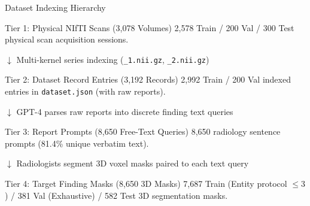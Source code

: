 \documentclass[aspectratio=169, 10pt]{beamer}
\begin{document}
\begin{frame}{Dataset Indexing Hierarchy}
    \vspace{-0.5em}
    \begin{block}{Tier 1: Physical NIfTI Scans (3,078 Volumes)}
        \footnotesize 2,578 Train / 200 Val / 300 Test physical scan acquisition sessions.
    \end{block}
    
    \vspace{-0.3em}
    \centering \tiny \color{tealaccent} $\downarrow$ Multi-kernel series indexing (\texttt{\_1.nii.gz}, \texttt{\_2.nii.gz}) \color{black}
    \vspace{-0.3em}
    
    \begin{block}{Tier 2: Dataset Record Entries (3,192 Records)}
        \footnotesize 2,992 Train / 200 Val indexed entries in \texttt{dataset.json} (with raw reports).
    \end{block}
    
    \vspace{-0.3em}
    \centering \tiny \color{tealaccent} $\downarrow$ GPT-4 parses raw reports into discrete finding text queries \color{black}
    \vspace{-0.3em}
    
    \begin{block}{Tier 3: Report Prompts (8,650 Free-Text Queries)}
        \footnotesize 8,650 radiology sentence prompts (81.4\% unique verbatim text).
    \end{block}
    
    \vspace{-0.3em}
    \centering \tiny \color{tealaccent} $\downarrow$ Radiologists segment 3D voxel masks paired to each text query \color{black}
    \vspace{-0.3em}
    
    \begin{block}{Tier 4: Target Finding Masks (8,650 3D Masks)}
        \footnotesize 7,687 Train (Entity protocol $\le 3$) / 381 Val (Exhaustive) / 582 Test 3D segmentation masks.
    \end{block}

\end{frame}
\end{document}
